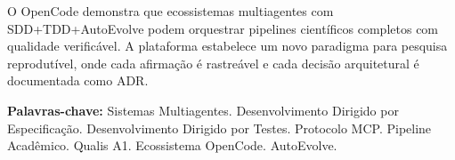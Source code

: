 O OpenCode demonstra que ecossistemas multiagentes com SDD+\-TDD+\-Auto\-Evolve podem orquestrar pipelines científicos completos com qualidade verificável. A plataforma estabelece um novo paradigma para pesquisa reprodutível, onde cada afirmação é rastreável e cada decisão arquitetural é documentada como ADR.

\vspace{1cm}
\noindent\textbf{Palavras-chave:} Sistemas Multiagentes. Desenvolvimento Dirigido por Especificação. Desenvolvimento Dirigido por Testes. Protocolo MCP. Pipeline Acadêmico. Qualis A1. Ecossistema OpenCode. AutoEvolve.
\newpage
